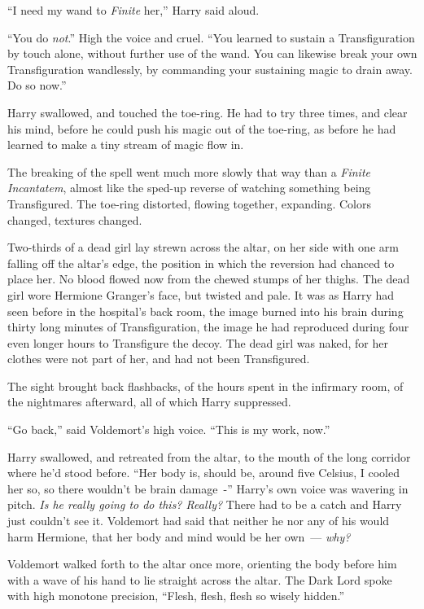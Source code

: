 ``I need my wand to \emph{Finite} her,'' Harry said aloud.

``You do \emph{not}.'' High the voice and cruel. ``You learned to sustain a Transfiguration by touch alone, without further use of the wand. You can likewise break your own Transfiguration wandlessly, by commanding your sustaining magic to drain away. Do so now.''

Harry swallowed, and touched the toe-ring. He had to try three times, and clear his mind, before he could push his magic out of the toe-ring, as before he had learned to make a tiny stream of magic flow in.

The breaking of the spell went much more slowly that way than a \emph{Finite Incantatem}, almost like the sped-up reverse of watching something being Transfigured. The toe-ring distorted, flowing together, expanding. Colors changed, textures changed.

Two-thirds of a dead girl lay strewn across the altar, on her side with one arm falling off the altar's edge, the position in which the reversion had chanced to place her. No blood flowed now from the chewed stumps of her thighs. The dead girl wore Hermione Granger's face, but twisted and pale. It was as Harry had seen before in the hospital's back room, the image burned into his brain during thirty long minutes of Transfiguration, the image he had reproduced during four even longer hours to Transfigure the decoy. The dead girl was naked, for her clothes were not part of her, and had not been Transfigured.

The sight brought back flashbacks, of the hours spent in the infirmary room, of the nightmares afterward, all of which Harry suppressed.

``Go back,'' said Voldemort's high voice. ``This is my work, now.''

Harry swallowed, and retreated from the altar, to the mouth of the long corridor where he'd stood before. ``Her body is, should be, around five Celsius, I cooled her so, so there wouldn't be brain damage~-'' Harry's own voice was wavering in pitch. \emph{Is he really going to do this? Really?} There had to be a catch and Harry just couldn't see it. Voldemort had said that neither he nor any of his would harm Hermione, that her body and mind would be her own~--- \emph{why?}

Voldemort walked forth to the altar once more, orienting the body before him with a wave of his hand to lie straight across the altar. The Dark Lord spoke with high monotone precision, ``Flesh, flesh, flesh so wisely hidden.''

